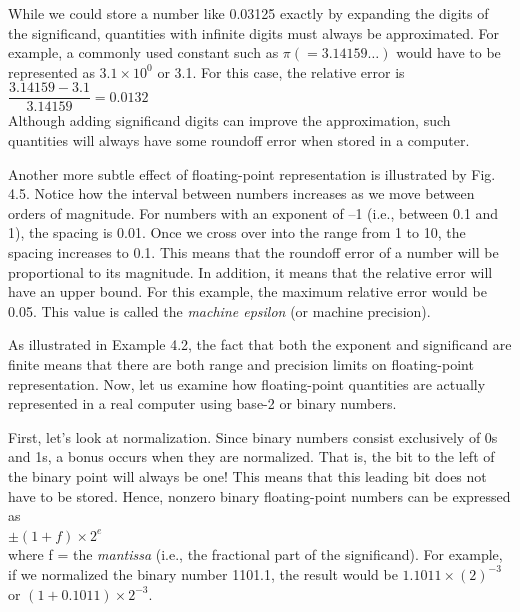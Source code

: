 \documentclass[../main.tex]{subfiles}
\begin{document}
\begin{example}
    While we could store a number like 0.03125 exactly by expanding the digits of the
    significand, quantities with infinite digits must always be approximated. For example, a
    commonly used constant such as $\pi (=3.14159\hdots)$ would have to be represented as $3.1\times 10^0$
    or 3.1. For this case, the relative error is\\

    $\dfrac{3.14159-3.1}{3.14159} = 0.0132$\\

    \noindent
    Although adding significand digits can improve the approximation, such quantities will
    always have some roundoff error when stored in a computer.
    
    Another more subtle effect of floating-point representation is illustrated by Fig. 4.5.
    Notice how the interval between numbers increases as we move between orders of magnitude.
    For numbers with an exponent of --1 (i.e., between 0.1 and 1), the spacing is 0.01.
    Once we cross over into the range from 1 to 10, the spacing increases to 0.1. This means
    that the roundoff error of a number will be proportional to its magnitude. In addition, it
    means that the relative error will have an upper bound. For this example, the maximum
    relative error would be 0.05. This value is called the \emph{machine epsilon} (or machine
    precision).\\
\end{example}

As illustrated in Example 4.2, the fact that both the exponent and significand are finite
means that there are both range and precision limits on floating-point representation. Now,
let us examine how floating-point quantities are actually represented in a real computer
using base-2 or binary numbers.

First, let's look at normalization. Since binary numbers consist exclusively of 0s and
1s, a bonus occurs when they are normalized. That is, the bit to the left of the binary point
will always be one! This means that this leading bit does not have to be stored. Hence,
nonzero binary floating-point numbers can be expressed as\\

$\pm (1+f)\times 2^e$\\

\noindent
where f = the \emph{mantissa} (i.e., the fractional part of the significand). For example, if we normalized
the binary number 1101.1, the result would be $1.1011\times (2)^{-3}$ or $(1+0.1011)\times2^{-3}$.
\end{document}
